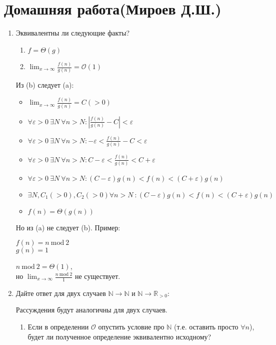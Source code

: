 \documentclass{article}
\begin{document}
\section{Домашняя работа(Мироев Д.Ш.)}

\newcommand{\limit}[0]{\displaystyle{\lim_{x \to \infty}}}

\begin{enumerate}

\item Эквивалентны ли следующие факты?

\begin{enumerate}
\item $f = \Theta(g)$
\item $\limit \frac{f(n)}{g(n)} = \mathcal{O}(1)$ 
\end{enumerate}

Из (b) следует (a):

\begin{itemize}
\item $\limit \frac{f(n)}{g(n)} = C(> 0)$
\item $\forall \varepsilon>0\ \exists N\ \forall n>N : \left|\frac{f(n)}{g(n)}-C\right|<\varepsilon$
\item $\forall \varepsilon>0\ \exists N\ \forall n>N : -\varepsilon<\frac{f(n)}{g(n)}-C<\varepsilon$
\item $\forall \varepsilon>0\ \exists N\ \forall n>N : C-\varepsilon<\frac{f(n)}{g(n)}<C+\varepsilon$
\item $\forall \varepsilon>0\ \exists N\ \forall n>N : (C-\varepsilon)g(n)<f(n)<(C+\varepsilon)g(n)$
\item $\exists N, C_1(>0), C_2(>0) \forall n>N\ : (C-\varepsilon)g(n)<f(n)<(C+\varepsilon)g(n)$
\item $f(n) = \Theta(g(n))$
\end{itemize}

Но из (a) не следует (b). Пример:

$f(n)=n\ \mathrm{mod}\ 2$ \\
$g(n)=1$

$n\ \mathrm{mod}\ 2 = \Theta(1)$,\\
но $\limit \frac{n\ \mathrm{mod}\ 2}{1}$ не существует.

\item Дайте ответ для двух случаев $\mathbb{N} \rightarrow \mathbb{N}$ и $\mathbb{N} \rightarrow \mathbb{R}_{>0}$:

Рассуждения будут аналогичны для двух случаев.

\begin{enumerate}
\item Если в определении $\mathcal{O}$ опустить условие про $\mathbb{N}$ (т.е.
оставить просто $\forall n$), будет ли полученное определение эквивалентно исходному?


\end{enumerate}
\end{enumerate}
\end{document}
